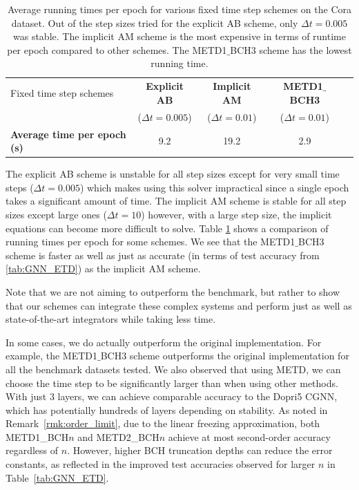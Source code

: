 \documentclass[12pt]{article}
\begin{document}
\begin{table}[t]
\caption{Average running times per epoch for various fixed time step schemes on the Cora dataset. Out of the step sizes tried for the explicit AB scheme, only $\Delta t= 0.005$ was stable. The implicit AM scheme is the most expensive in terms of runtime per epoch compared to other schemes. The METD1$\_$BCH3 scheme has the lowest running time.}
\vskip 0.15in
\begin{center}
\begin{small}
\begin{sc}
\begin{tabular}{lcccr}
\hline
  Fixed time step schemes & \bf Explicit AB & \bf Implicit AM & \bf METD1$\_$BCH3 \\
  & ($\Delta t = 0.005$) & ($\Delta t = 0.01$) &  ($\Delta t = 0.01$) \\
  \hline
\bf Average time per epoch (s) & 9.2 & 19.2 &  2.9 \\ 

\hline
\end{tabular}
\end{sc}
\end{small}
\end{center}
\vskip -0.1in
\label{tab:runnung_times}
\end{table}


The explicit AB scheme is unstable for all step sizes except for very small time steps ($\Delta t = 0.005$) which makes using this solver impractical since a single epoch takes a significant amount of time. The implicit AM scheme is stable for all step sizes except large ones ($\Delta t = 10$) however, with a large step size, the implicit equations can become more difficult to solve. Table \ref{tab:runnung_times} shows a comparison of running times per epoch for some schemes. We see that the METD1$\_$BCH3 scheme is faster as well as just as accurate (in terms of test accuracy from \cref{tab:GNN_ETD}) as the implicit AM scheme. 


Note that we are not aiming to outperform the benchmark, but rather to show that our schemes can integrate these complex systems and perform just as well as state-of-the-art integrators while taking less time.

In some cases, we do actually outperform the original implementation. For example, the METD1$\_$BCH3 scheme outperforms the original implementation for all the benchmark datasets tested. We also observed that using METD, we can choose the time step to be significantly larger than when using other methods. With just $3$ layers, we can achieve comparable accuracy to the Dopri5 CGNN, which has potentially hundreds of layers depending on stability. As noted in Remark~\ref{rmk:order_limit}, due to the linear freezing approximation, both METD1\_BCH$n$ and METD2\_BCH$n$ achieve at most second-order accuracy regardless of $n$. However, higher BCH truncation depths can reduce the error constants, as reflected in the improved test accuracies observed for larger $n$ in Table~\ref{tab:GNN_ETD}.
\end{document}
